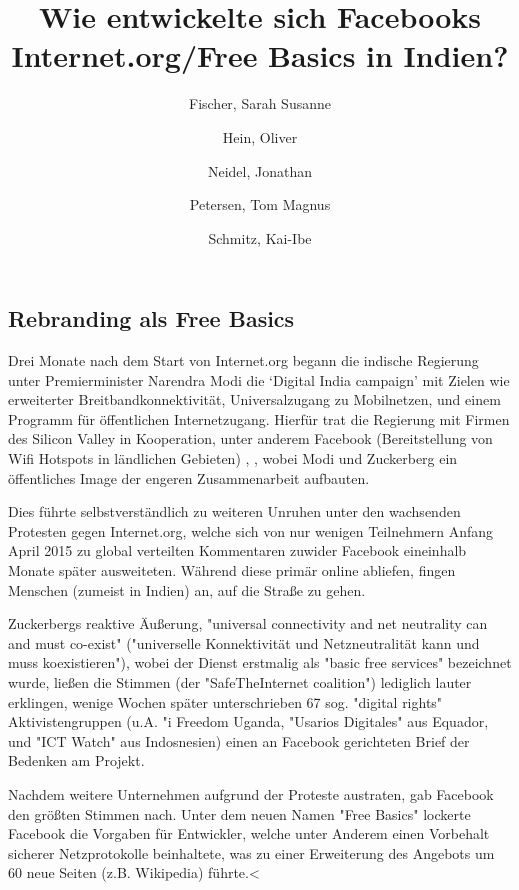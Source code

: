 \documentclass{article}
\title{Wie entwickelte sich Facebooks Internet.org/Free Basics in Indien?}
\author{
  Fischer, Sarah Susanne\\
  \and
  Hein, Oliver\\
  \and
  Neidel, Jonathan\\
  \and
  Petersen, Tom Magnus\\
  \and
  Schmitz, Kai-Ibe\\
}
\begin{document}
\maketitle

\subsection{Rebranding als Free Basics}

Drei Monate nach dem Start von Internet.org begann die indische Regierung unter Premierminister Narendra Modi die `Digital India campaign' mit Zielen wie erweiterter Breitbandkonnektivität, Universalzugang zu Mobilnetzen, und einem Programm für öffentlichen Internetzugang. %
Hierfür trat die Regierung mit Firmen des Silicon Valley in Kooperation, unter anderem Facebook (Bereitstellung von Wifi Hotspots in ländlichen Gebieten) \parencite[254]{everydayLife},
, wobei Modi und Zuckerberg ein öffentliches Image der engeren Zusammenarbeit aufbauten.

\medskip

Dies führte selbstverständlich zu weiteren Unruhen unter den wachsenden Protesten gegen Internet.org, welche sich von nur wenigen Teilnehmern Anfang April 2015 zu global verteilten Kommentaren zuwider Facebook eineinhalb Monate später ausweiteten. %
Während diese primär online abliefen, fingen Menschen (zumeist in Indien) an, auf die Straße zu gehen.

\medskip

Zuckerbergs reaktive Äußerung, "universal connectivity and net neutrality can and must co-exist" ("universelle Konnektivität und Netzneutralität kann und muss koexistieren"), wobei der Dienst erstmalig als "basic free services" bezeichnet wurde, ließen die Stimmen (der "SafeTheInternet coalition") lediglich lauter erklingen, wenige Wochen später unterschrieben 67 sog. "digital rights" Aktivistengruppen (u.A. "i Freedom Uganda, "Usarios Digitales" aus Equador, und "ICT Watch" aus Indosnesien) einen an Facebook gerichteten Brief der Bedenken am Projekt.

\medskip
\medskip

Nachdem weitere Unternehmen aufgrund der Proteste austraten, gab Facebook den größten Stimmen nach. Unter dem neuen Namen "Free Basics" lockerte Facebook die Vorgaben für Entwickler, welche unter Anderem einen Vorbehalt sicherer Netzprotokolle beinhaltete, was zu einer Erweiterung des Angebots um 60 neue Seiten (z.B. Wikipedia) führte.<

\medskip

\end{document}
